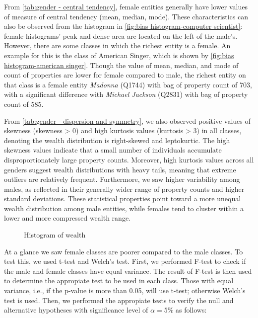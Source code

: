 From \autoref{tab:gender - central tendency}, female entities generally have lower values of measure of central tendency (mean, median, mode). These characteristics can also be observed from the histogram in \autoref{fig:bias histogram-computer scientist}: female histograms’ peak and dense area are located on the left of the male’s. However, there are some classes in which the richest entity is a female. An example for this is the class of American Singer, which is shown by \autoref{fig:bias histogram-american singer}. Though the value of mean, median, and mode of count of properties are lower for female compared to male, the richest entity on that class is a female entity \textit{Madonna} (Q1744) with bag of property count of 703, with a significant difference with \textit{Michael Jackson} (Q2831) with bag of property count of 585.

From \autoref{tab:gender - dispersion and symmetry}, we also observed positive values of skewness (skewness > 0) and high kurtosis values (kurtosis > 3) in all classes, denoting the wealth distribution is right-skewed and leptokurtic. The high skewness values indicate that a small number of individuals accumulate disproportionately large property counts. Moreover, high kurtosis values across all genders suggest wealth distributions with heavy tails, meaning that extreme outliers are relatively frequent. Furthermore, we saw higher variability among males, as reflected in their generally wider range of property counts and higher standard deviations. These statistical properties point toward a more unequal wealth distribution among male entities, while females tend to cluster within a lower and more compressed wealth range.

\begin{figure}[!h]
\centering 
{}


\caption{Histogram of wealth} \label{fig:Histogram of Wealth}

\end{figure}

At a glance we saw female classes are poorer compared to the male classes. To test this, we used t-test and Welch's test. First, we performed F-test to check if the male and female classes have equal variance. The result of F-test is then used to determine the appropiate test to be used in each class. Those with equal variance, i.e., if the p-value is more than 0.05, will use t-test; otherwise Welch's test is used. Then, we performed the appropiate tests to verify the null and alternative hypotheses with significance level of \(\alpha=5\%\) as follows:

